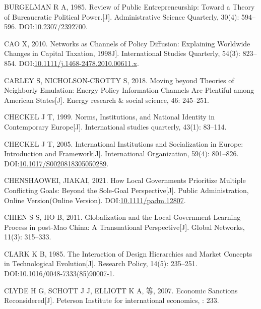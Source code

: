 \documentclass[
  12pt,
]{ctexart}
\newlength{\cslhangindent}
\newlength{\cslentryspacingunit} %
\newenvironment{CSLReferences}[2] %
 {%
  \setlength{\parindent}{0pt}
  \ifodd #1
  \let\oldpar\par
  \def\par{\hangindent=\cslhangindent\oldpar}
  \fi
  \setlength{\parskip}{#2\cslentryspacingunit}
 }%
 {}
\begin{document}
\begin{CSLReferences}{1}{0}
\leavevmode{}%
BURGELMAN R A, 1985. Review of {Public Entrepreneurship}: {Toward} a {Theory} of {Bureaucratic Political Power}.{[}J{]}. Administrative Science Quarterly, 30(4): 594--596. DOI:\href{https://doi.org/10.2307/2392700}{10.2307/2392700}.

\leavevmode{}%
CAO X, 2010. Networks as {Channels} of {Policy Diffusion}: {Explaining Worldwide Changes} in {Capital Taxation}, 1998\textendash 2006{[}J{]}. International Studies Quarterly, 54(3): 823--854. DOI:\href{https://doi.org/10.1111/j.1468-2478.2010.00611.x}{10.1111/j.1468-2478.2010.00611.x}.

\leavevmode{}%
CARLEY S, NICHOLSON-CROTTY S, 2018. Moving beyond Theories of Neighborly Emulation: {Energy} Policy Information Channels Are Plentiful among {American} States{[}J{]}. Energy research \& social science, 46: 245--251.

\leavevmode{}%
CHECKEL J T, 1999. Norms, Institutions, and National Identity in Contemporary {Europe}{[}J{]}. International studies quarterly, 43(1): 83--114.

\leavevmode{}%
CHECKEL J T, 2005. International {Institutions} and {Socialization} in {Europe}: {Introduction} and {Framework}{[}J{]}. International Organization, 59(4): 801--826. DOI:\href{https://doi.org/10.1017/S0020818305050289}{10.1017/S0020818305050289}.

\leavevmode{}%
CHENSHAOWEI, JIAKAI, 2021. How Local Governments Prioritize Multiple Conflicting Goals: {Beyond} the Sole-Goal Perspective{[}J{]}. Public Administration, Online Version(Online Version). DOI:\href{https://doi.org/10.1111/padm.12807}{10.1111/padm.12807}.

\leavevmode{}%
CHIEN S-S, HO B, 2011. Globalization and the Local Government Learning Process in post-{Mao China}: A Transnational Perspective{[}J{]}. Global Networks, 11(3): 315--333.

\leavevmode{}%
CLARK K B, 1985. The Interaction of Design Hierarchies and Market Concepts in Technological Evolution{[}J{]}. Research Policy, 14(5): 235--251. DOI:\href{https://doi.org/10.1016/0048-7333(85)90007-1}{10.1016/0048-7333(85)90007-1}.

\leavevmode{}%
CLYDE H G, SCHOTT J J, ELLIOTT K A, 等, 2007. Economic {Sanctions Reconsidered}{[}J{]}. Peterson Institute for international economics, : 233.


\end{CSLReferences}
\end{document}
